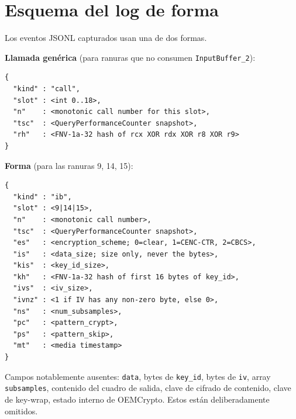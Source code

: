 \documentclass[11pt,letterpaper]{article}
\let\oldsection\section
\renewcommand{\section}{\clearpage\oldsection}
\begin{document}
\section{Esquema del log de forma}
\label{app:schema}

Los eventos JSONL capturados usan una de dos formas.

\textbf{Llamada genérica} (para ranuras que no consumen
\texttt{InputBuffer\_2}):
\begin{lstlisting}[basicstyle=\ttfamily\footnotesize]
{
  "kind" : "call",
  "slot" : <int 0..18>,
  "n"    : <monotonic call number for this slot>,
  "tsc"  : <QueryPerformanceCounter snapshot>,
  "rh"   : <FNV-1a-32 hash of rcx XOR rdx XOR r8 XOR r9>
}
\end{lstlisting}

\textbf{Forma} (para las ranuras 9, 14, 15):
\begin{lstlisting}[basicstyle=\ttfamily\footnotesize]
{
  "kind" : "ib",
  "slot" : <9|14|15>,
  "n"    : <monotonic call number>,
  "tsc"  : <QueryPerformanceCounter snapshot>,
  "es"   : <encryption_scheme; 0=clear, 1=CENC-CTR, 2=CBCS>,
  "is"   : <data_size; size only, never the bytes>,
  "kis"  : <key_id_size>,
  "kh"   : <FNV-1a-32 hash of first 16 bytes of key_id>,
  "ivs"  : <iv_size>,
  "ivnz" : <1 if IV has any non-zero byte, else 0>,
  "ns"   : <num_subsamples>,
  "pc"   : <pattern_crypt>,
  "ps"   : <pattern_skip>,
  "mt"   : <media timestamp>
}
\end{lstlisting}

Campos notablemente ausentes:
\texttt{data}, bytes de \texttt{key\_id}, bytes de \texttt{iv},
array \texttt{subsamples}, contenido del cuadro de salida,
clave de cifrado de contenido, clave de key-wrap, estado interno
de OEMCrypto. Estos están deliberadamente omitidos.
\end{document}
